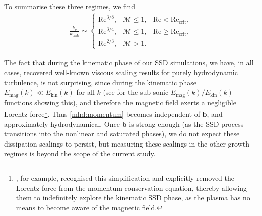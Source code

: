 \documentclass[12pt,twoside]{extreport}
\newcommand{\mVector}[1]{\bm{#1}} %
\newcommand{\mReh}{\ensuremath{\mathrm{Re}}} %
\newcommand{\mSonicMach}{\ensuremath{\mathcal{M}}} %
\providecommand{\DIFaddbegin}{} %
\providecommand{\DIFaddend}{} %
\providecommand{\DIFdelbegin}{} %
\providecommand{\DIFdelend}{} %
\providecommand{\DIFscaledelfig}{0.5}
\newlength{\DIFdelgraphicswidth} %
\newlength{\DIFdelgraphicsheight} %
\providecommand{\DIFaddincludegraphics}[2][]{{\color{DIFgreen}\fbox{\DIFOincludegraphics[#1]{#2}}}} %
\providecommand{\DIFdelincludegraphics}[2][]{%
\sbox{\DIFdelgraphicsbox}{\DIFOincludegraphics[#1]{#2}}%
\settoboxwidth{\DIFdelgraphicswidth}{\DIFdelgraphicsbox} %
\settoboxtotalheight{\DIFdelgraphicsheight}{\DIFdelgraphicsbox} %
\scalebox{\DIFscaledelfig}{%
\parbox[b]{\DIFdelgraphicswidth}{\usebox{\DIFdelgraphicsbox}\\[-\baselineskip] \rule{\DIFdelgraphicswidth}{0em}}\llap{\resizebox{\DIFdelgraphicswidth}{\DIFdelgraphicsheight}{%
\setlength{\unitlength}{\DIFdelgraphicswidth}%
\begin{picture}(1,1)%
\thicklines\linethickness{2pt} %
{\color{DIFpurple}\put(0,0){\framebox(1,1){}}}%
{\color{DIFpurple}\put(0,0){\line( 1,1){1}}}%
{\color{DIFpurple}\put(0,1){\line(1,-1){1}}}%
\end{picture}%
}\hspace*{3pt}}} %
} %
\DeclareRobustCommand{\DIFaddbegin}{\DIFOaddbegin \let\includegraphics\DIFaddincludegraphics} %
\DeclareRobustCommand{\DIFaddend}{\DIFOaddend \let\includegraphics\DIFOincludegraphics} %
\DeclareRobustCommand{\DIFdelbegin}{\DIFOdelbegin \let\includegraphics\DIFdelincludegraphics} %
\DeclareRobustCommand{\DIFdelend}{\DIFOaddend \let\includegraphics\DIFOincludegraphics} %
\begin{document}
\DIFdelend To summarise these three regimes, we find
\DIFdelbegin %
\DIFdelend \DIFaddbegin \begin{align}
    \frac{k_{\nu}}{k_\mathrm{turb}}
        \sim \left\{\begin{matrix}
            \mReh^{3/8}, & \mSonicMach \leq 1, & \mReh < \mReh_\mathrm{crit}, \\
            \mReh^{3/4}, & \mSonicMach \leq 1, & \mReh \geq \mReh_\mathrm{crit}, \\
            \mReh^{2/3}, & \mSonicMach > 1 .
        \end{matrix}\right.
    \label{eqn:knu_scaling}
\end{align}\DIFaddend

The fact that during the kinematic phase of our SSD simulations, we have, in all cases, recovered well-known viscous scaling results for purely hydrodynamic turbulence, is not surprising, since during the kinematic phase \mbox{$E_\mathrm{mag}(k) \ll E_\mathrm{kin}(k)$} for all $k$ (see \citealt{beattie2022growth} for the sub-sonic $E_\mathrm{mag}(k)/E_\mathrm{kin}(k)$ functions showing this), and therefore the magnetic field exerts a negligible Lorentz force\footnote{
    \citet{brandenburg2023dissipative}, for example, recognised this simplification and explicitly removed the Lorentz force from the momentum conservation equation, thereby allowing them to indefinitely explore the kinematic SSD phase, as the plasma has no means to become aware of the magnetic field.
}. Thus \autoref{mhd:momentum} becomes independent of $\mVector{b}$, and approximately hydrodynamical. Once $\mVector{b}$ is strong enough (as the SSD process transitions into the nonlinear and saturated phases), we do not expect these dissipation scalings to persist, but measuring these scalings in the other growth regimes is beyond the scope of the current study.
\end{document}
